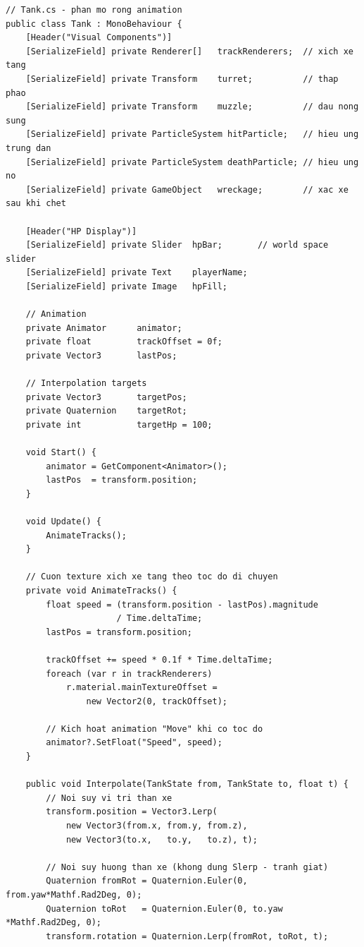 \documentclass[12pt,a4paper]{report}
\begin{document}
\begin{lstlisting}[style=bashStyle, caption={Tank.cs --- animation track và hiệu ứng trúng đạn}, label={lst:tankvisual}]
// Tank.cs - phan mo rong animation
public class Tank : MonoBehaviour {
    [Header("Visual Components")]
    [SerializeField] private Renderer[]   trackRenderers;  // xich xe tang
    [SerializeField] private Transform    turret;          // thap phao
    [SerializeField] private Transform    muzzle;          // dau nong sung
    [SerializeField] private ParticleSystem hitParticle;   // hieu ung trung dan
    [SerializeField] private ParticleSystem deathParticle; // hieu ung no
    [SerializeField] private GameObject   wreckage;        // xac xe sau khi chet

    [Header("HP Display")]
    [SerializeField] private Slider  hpBar;       // world space slider
    [SerializeField] private Text    playerName;
    [SerializeField] private Image   hpFill;

    // Animation
    private Animator      animator;
    private float         trackOffset = 0f;
    private Vector3       lastPos;

    // Interpolation targets
    private Vector3       targetPos;
    private Quaternion    targetRot;
    private int           targetHp = 100;

    void Start() {
        animator = GetComponent<Animator>();
        lastPos  = transform.position;
    }

    void Update() {
        AnimateTracks();
    }

    // Cuon texture xich xe tang theo toc do di chuyen
    private void AnimateTracks() {
        float speed = (transform.position - lastPos).magnitude
                      / Time.deltaTime;
        lastPos = transform.position;

        trackOffset += speed * 0.1f * Time.deltaTime;
        foreach (var r in trackRenderers)
            r.material.mainTextureOffset =
                new Vector2(0, trackOffset);

        // Kich hoat animation "Move" khi co toc do
        animator?.SetFloat("Speed", speed);
    }

    public void Interpolate(TankState from, TankState to, float t) {
        // Noi suy vi tri than xe
        transform.position = Vector3.Lerp(
            new Vector3(from.x, from.y, from.z),
            new Vector3(to.x,   to.y,   to.z), t);

        // Noi suy huong than xe (khong dung Slerp - tranh giat)
        Quaternion fromRot = Quaternion.Euler(0, from.yaw*Mathf.Rad2Deg, 0);
        Quaternion toRot   = Quaternion.Euler(0, to.yaw  *Mathf.Rad2Deg, 0);
        transform.rotation = Quaternion.Lerp(fromRot, toRot, t);


\end{lstlisting}
\end{document}

